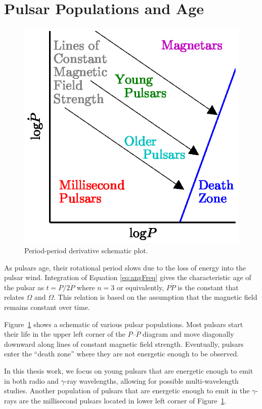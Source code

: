 \section{Pulsar Populations and Age}
\label{sec:popAndAge}

\begin{figure}[t!!]
\includegraphics[width=.95\textwidth]{chapters/pulsarAnatomy/figures/ppdot.eps}
\caption[Period-period derivative schematic plot]{
\label{fig:ppdot} Period-period derivative schematic plot.}
\end{figure}

As pulsars age, their rotational period slows due to 
the loss of energy into the pulsar wind. 
Integration of Equation \ref{eq:angFreq} gives the characteristic
age of the pulsar as $t=P/2\dot{P}$
where $n=3$ or equivalently, $P\dot{P}$ is the
constant that relates $\Omega$ and $\dot{\Omega}$.
This relation is based on the assumption 
that the magnetic field
remains constant over time.

Figure~\ref{fig:ppdot} shows a schematic of various
pulsar populations.  Most pulsars start their
life in the upper left corner of the $P$--$\dot{P}$ diagram
and move diagonally downward along lines of constant
magnetic field strength.  Eventually, pulsars enter the ``death zone'' 
where they are not energetic enough to be observed.

In this thesis work, we focus on young pulsars
that are energetic enough to emit in both
radio and $\gamma$-ray wavelengths, allowing
for possible multi-wavelength studies.
Another population of pulsars that 
are energetic enough to emit in the
$\gamma$-rays are the millisecond pulsars
located in lower left corner of Figure~\ref{fig:ppdot}.

